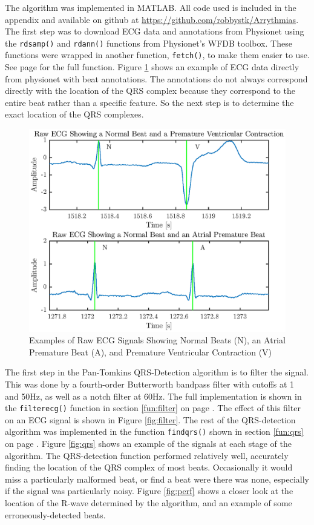 \documentclass[12pt,letter]{article}
\newcommand{\rpref}[1]{\ref{#1} on page \pageref{#1}}
\begin{document}
The algorithm was implemented in MATLAB.  All code used is included in the
appendix and available on github at
\url{https://github.com/robbystk/Arrythmias}. The first step was to download ECG
data and annotations from Physionet using the \verb`rdsamp()` and \verb`rdann()`
functions from Physionet's WFDB toolbox.  These functions were wrapped in
another function, \verb`fetch()`, to make them easier to use.  See page
\pageref{fun:fetch} for the full function.  Figure \ref{fig:raw} shows an
example of ECG data directly from physionet with beat annotations.  The
annotations do not always correspond directly with the location of the QRS
complex because they correspond to the entire beat rather than a specific
feature.  So the next step is to determine the exact location of the QRS
complexes.  

\begin{figure}[hbtp]
    \centering
    \includegraphics[height=0.44\textheight]{../figures/figures_01}
    \caption{Examples of Raw ECG Signals Showing Normal Beats (N), an Atrial
    Premature Beat (A), and Premature Ventricular Contraction (V)}
    \label{fig:raw}
\end{figure}

The first step in the Pan-Tomkins QRS-Detection algorithm is to filter the
signal.  This was done by a fourth-order Butterworth bandpass filter with
cutoffs at 1 and 50Hz, as well as a notch filter at 60Hz.  The full
implementation is shown in the \verb`filterecg()` function in section
\rpref{fun:filter}.  The effect of this filter on an ECG signal is shown in
Figure \ref{fig:filter}.  The rest of the QRS-detection algorithm was
implemented in the function \verb`findqrs()` shown in section \rpref{fun:qrs}.
Figure \ref{fig:qrs} shows an example of the signals at each stage of the
algorithm.  The QRS-detection function performed relatively well, accurately
finding the location of the QRS complex of most beats.  Occasionally it would
miss a particularly malformed beat, or find a beat were there was none,
especially if the signal was particularly noisy.  Figure \ref{fig:perf} shows a
closer look at the location of the R-wave determined by the algorithm, and an
example of some erroneously-detected beats.
\end{document}
